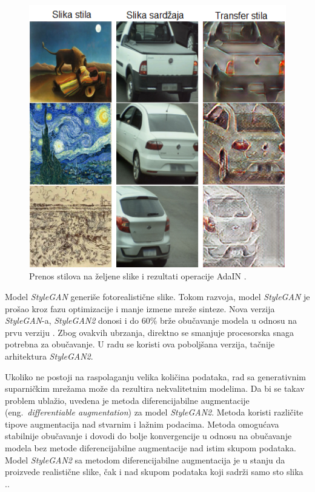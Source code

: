 \documentclass[12pt,oneside]{memoir}
\begin{document}
\begin{figure}[ht]
    \centering
    \includegraphics[width=1\textwidth]{matfmaster/glava2/adain_cus.png}
    \caption{Prenos stilova na željene slike i rezultati operacije AdaIN \cite{huang2017arbitrary}. }
    \label{fig:section2_augmentation_adain}
\end{figure}


Model \textit{StyleGAN} generiše fotorealistične slike. Tokom razvoja, model \textit{StyleGAN} je prošao kroz fazu optimizacije i manje izmene mreže sinteze. Nova verzija \textit{StyleGAN}-a, \textit{StyleGAN2} donosi i do 60\% brže obučavanje modela u odnosu na prvu verziju \cite{karras2020analyzing}. Zbog ovakvih ubrzanja, direktno se smanjuje procesorska snaga potrebna za obučavanje. U radu se koristi ova poboljšana verzija, tačnije arhitektura \textit{StyleGAN2}.

Ukoliko ne postoji na raspolaganju velika količina podataka, rad sa generativnim suparničkim mrežama može da rezultira nekvalitetnim modelima.
Da bi se takav problem ublažio, uvedena je metoda diferencijabilne augmentacije (eng.~\textit{differentiable augmentation}) za model \textit{StyleGAN2}. Metoda koristi različite tipove augmentacija nad stvarnim i lažnim podacima. Metoda omogućava stabilnije obučavanje i dovodi do bolje konvergencije u odnosu na obučavanje modela bez metode diferencijabilne augmentacije nad istim skupom podataka. Model \textit{StyleGAN2} sa metodom diferencijabilne augmentacija je u stanju da proizvede realistične slike, čak i nad skupom podataka koji sadrži samo sto slika \cite{zhao2020differentiable}..
\end{document}

